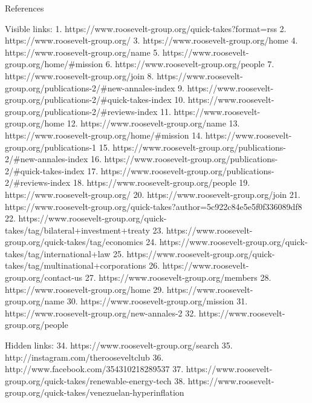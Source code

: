 References

   Visible links:
   1. https://www.roosevelt-group.org/quick-takes?format=rss
   2. https://www.roosevelt-group.org/
   3. https://www.roosevelt-group.org/home
   4. https://www.roosevelt-group.org/name
   5. https://www.roosevelt-group.org/home/#mission
   6. https://www.roosevelt-group.org/people
   7. https://www.roosevelt-group.org/join
   8. https://www.roosevelt-group.org/publications-2/#new-annales-index
   9. https://www.roosevelt-group.org/publications-2/#quick-takes-index
  10. https://www.roosevelt-group.org/publications-2/#reviews-index
  11. https://www.roosevelt-group.org/home
  12. https://www.roosevelt-group.org/name
  13. https://www.roosevelt-group.org/home/#mission
  14. https://www.roosevelt-group.org/publications-1
  15. https://www.roosevelt-group.org/publications-2/#new-annales-index
  16. https://www.roosevelt-group.org/publications-2/#quick-takes-index
  17. https://www.roosevelt-group.org/publications-2/#reviews-index
  18. https://www.roosevelt-group.org/people
  19. https://www.roosevelt-group.org/
  20. https://www.roosevelt-group.org/join
  21. https://www.roosevelt-group.org/quick-takes?author=5c922c84e5e5f0f336089df8
  22. https://www.roosevelt-group.org/quick-takes/tag/bilateral+investment+treaty
  23. https://www.roosevelt-group.org/quick-takes/tag/economics
  24. https://www.roosevelt-group.org/quick-takes/tag/international+law
  25. https://www.roosevelt-group.org/quick-takes/tag/multinational+corporations
  26. https://www.roosevelt-group.org/contact-us
  27. https://www.roosevelt-group.org/members
  28. https://www.roosevelt-group.org/home
  29. https://www.roosevelt-group.org/name
  30. https://www.roosevelt-group.org/mission
  31. https://www.roosevelt-group.org/new-annales-2
  32. https://www.roosevelt-group.org/people

   Hidden links:
  34. https://www.roosevelt-group.org/search
  35. http://instagram.com/therooseveltclub
  36. http://www.facebook.com/354310218289537
  37. https://www.roosevelt-group.org/quick-takes/renewable-energy-tech
  38. https://www.roosevelt-group.org/quick-takes/venezuelan-hyperinflation
